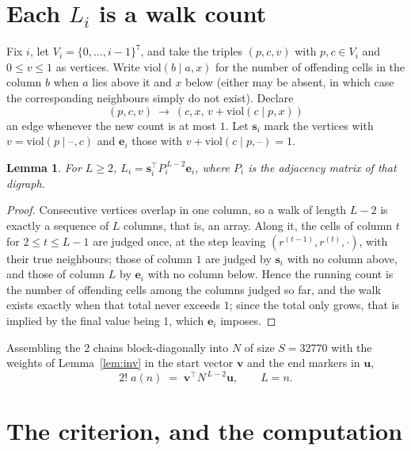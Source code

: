 \documentclass[11pt,a4paper]{article}
\theoremstyle{plain}
\newtheorem{lemma}[theorem]{Lemma}
\theoremstyle{definition}
\begin{document}
\section{Each $L_i$ is a walk count}

Fix $i$, let $V_i=\{0,\dots,i-1\}^{7}$, and take the triples $(p,c,v)$ with
$p,c\in V_i$ and $0\le v\le1$ as vertices. Write $\mathrm{viol}(b\mid a,x)$ for the number
of offending cells in the column $b$ when $a$ lies above it and $x$ below (either may be
absent, in which case the corresponding neighbours simply do not exist). Declare
\[
(p,c,v)\ \longrightarrow\ (c,x,\,v+\mathrm{viol}(c\mid p,x))
\]
an edge whenever the new count is at most $1$. Let $\mathbf{s}_i$ mark the vertices with
$v=\mathrm{viol}(p\mid\text{--},c)$ and $\mathbf{e}_i$ those with
$v+\mathrm{viol}(c\mid p,\text{--})=1$.

\begin{lemma}\label{lem:walk}
For $L\ge2$, $L_i=\mathbf{s}_i^{\!\top}P_i^{\,L-2}\mathbf{e}_i$, where $P_i$ is the
adjacency matrix of that digraph.
\end{lemma}

\begin{proof}
Consecutive vertices overlap in one column, so a walk of length $L-2$ is exactly a sequence
of $L$ columns, that is, an array. Along it, the cells of column $t$ for $2\le t\le L-1$ are
judged once, at the step leaving $(r^{(t-1)},r^{(t)},\cdot)$, with their true neighbours;
those of column $1$ are judged by $\mathbf{s}_i$ with no column above, and those of column
$L$ by $\mathbf{e}_i$ with no column below. Hence the running count is the number of
offending cells among the columns judged so far, and the walk exists exactly when that total
never exceeds $1$; since the total only grows, that is implied by the final value being
$1$, which $\mathbf{e}_i$ imposes.
\end{proof}

Assembling the $2$ chains block-diagonally into $N$ of size $S=32770$ with the weights of
Lemma~\ref{lem:inv} in the start vector $\mathbf{v}$ and the end markers in
$\mathbf{u}$,
\begin{equation}\label{eq:walk2}
2!\;a(n)\;=\;\mathbf{v}^{\!\top}N^{\,L-2}\mathbf{u},\qquad L=n .
\end{equation}

\section{The criterion, and the computation}
\end{document}

